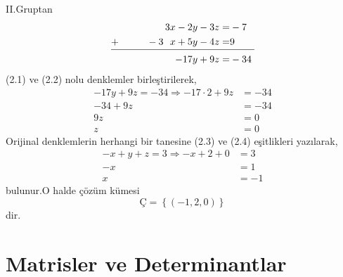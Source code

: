 \documentclass[a4paper,10pt]{book}
\theoremstyle{italik}
\begin{document}
II.Gruptan
\begin{alignat}{4}
	3x-2y-3z= & -7 \nonumber \\
	\underline{+ \hspace{10mm}-3\ \ \strut x+5y-4z= } & \underline{\strut 9 \qquad}\nonumber \\
	-17y+9z= & -34 
\end{alignat}
(2.1) ve (2.2) nolu denklemler birleştirilerek,
\begin{align}
	-17y+9z=-34 \Rightarrow -17 \cdot 2+9z & =-34 \nonumber \\
	-34+9z & = -34 \nonumber \\
	9z & = 0  \nonumber \\ 
	z & = 0
\end{align}
Orijinal denklemlerin herhangi bir tanesine (2.3) ve (2.4) eşitlikleri yazılarak,
\begin{align}
	-x+y+z=3 \Rightarrow -x+2+0 & = 3 \nonumber \\
	-x & =1 \nonumber \\
	x & =-1  \nonumber  
\end{align}
bulunur.O halde çözüm kümesi
$$
\text{\c{C}}=\left\{(-1,2,0)\right\}
$$ 
dir.
\chapter{Matrisler ve Determinantlar}
\end{document}
